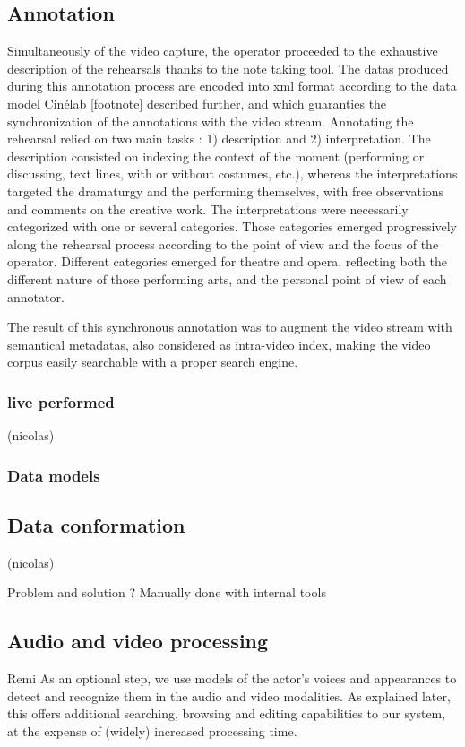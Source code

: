 \documentclass[conference]{IEEEtran}
\begin{document}
\subsection{Annotation}
Simultaneously of the video capture, the operator proceeded to the exhaustive description of the rehearsals thanks to the note taking tool. The datas produced during this annotation process are encoded into xml format according to the data model Cinélab [footnote] described further, and which guaranties the synchronization of the annotations with the video stream. 
Annotating the rehearsal relied on two main tasks : 1) description and 2) interpretation. The description consisted on indexing the context of the moment (performing or discussing, text lines, with or without costumes, etc.), whereas the interpretations targeted the dramaturgy and the performing themselves, with free observations and comments on the creative work. The interpretations were necessarily categorized with one or several categories. Those categories emerged progressively along the rehearsal process according to the point of view and the focus of the operator. 
Different categories emerged for theatre and opera, reflecting both the different nature of those performing arts, and the personal point of view of each annotator.

The result of this synchronous annotation was to augment the video stream with semantical metadatas, also considered as intra-video index, making the video corpus easily searchable with a proper search engine.
\subsubsection{live performed} (nicolas)

\subsubsection{Data models}


\subsection{Data conformation} (nicolas)

Problem and solution ? Manually done with internal tools

\subsection{Audio and video processing} Remi
As an optional step, we use models of  the actor's voices and appearances to detect and recognize them
in the audio and video modalities. As explained later, this offers additional searching, browsing and editing capabilities
to our system, at the expense of (widely) increased processing time.
\end{document}
